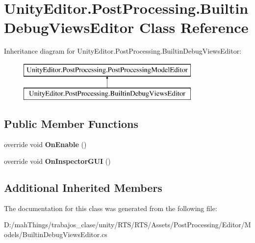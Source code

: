 \hypertarget{class_unity_editor_1_1_post_processing_1_1_builtin_debug_views_editor}{}\section{Unity\+Editor.\+Post\+Processing.\+Builtin\+Debug\+Views\+Editor Class Reference}
\label{class_unity_editor_1_1_post_processing_1_1_builtin_debug_views_editor}
Inheritance diagram for Unity\+Editor.\+Post\+Processing.\+Builtin\+Debug\+Views\+Editor\+:\begin{figure}[H]
\begin{center}
\leavevmode
\includegraphics[height=2.000000cm]{class_unity_editor_1_1_post_processing_1_1_builtin_debug_views_editor}
\end{center}
\end{figure}
\subsection*{Public Member Functions}
\begin{DoxyCompactItemize}
\item 
\mbox{\label{class_unity_editor_1_1_post_processing_1_1_builtin_debug_views_editor_a25ae9660ff2582094d46a5647ee1a5cf}} 
override void {\bfseries On\+Enable} ()
\item 
\mbox{\label{class_unity_editor_1_1_post_processing_1_1_builtin_debug_views_editor_a5707f6b766ba9c6ada9a266ecc69948b}} 
override void {\bfseries On\+Inspector\+G\+UI} ()
\end{DoxyCompactItemize}
\subsection*{Additional Inherited Members}


The documentation for this class was generated from the following file\+:\begin{DoxyCompactItemize}
\item 
D\+:/mah\+Things/trabajos\+\_\+clase/unity/\+R\+T\+S/\+R\+T\+S/\+Assets/\+Post\+Processing/\+Editor/\+Models/Builtin\+Debug\+Views\+Editor.\+cs\end{DoxyCompactItemize}
